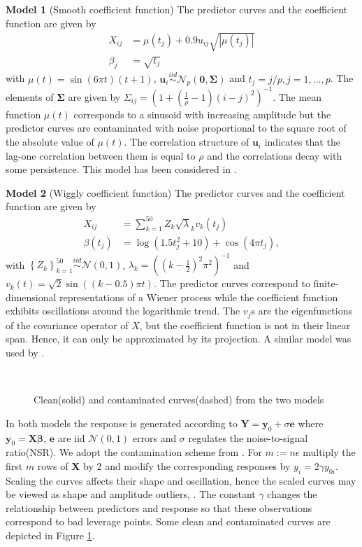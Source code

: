 \documentclass[11pt]{article}
\begin{document}
\textbf{Model 1} (Smooth coefficient function) The predictor curves and the coefficient function are given by
\begin{align*}
X_{ij} &= \mu(t_j) + 0.9 u_{ij}\sqrt{| \mu\left(t_j\right) |} \\ 
\beta_j & = \sqrt{t_{j}} 
\end{align*}
with $\mu(t) = \sin\left(6\pi t\right) \left(t+1\right)$, $\mathbf{u}_i \stackrel{iid}{\sim} \mathcal{N}_p \left( \mathbf{0}, \boldsymbol{\Sigma} \right)$ and $t_j = j/p, j = 1, \ldots, p$. The elements of $\boldsymbol{\Sigma}$ are given by $\Sigma_{ij} =\left( 1+\left( \frac{1}{\rho}-1 \right)(i-j)^2\right)^{-1}$. The mean function $\mu(t)$ corresponds to a sinusoid with increasing amplitude but the predictor curves are contaminated with noise proportional to the square root of the absolute value of $\mu(t)$.  The correlation structure of $\mathbf{u}_i$ indicates that the lag-one correlation between them is equal to $\rho$ and the correlations decay with some persistence. This model has been considered in \citet{maronna2013robust}.

\textbf{Model 2} (Wiggly coefficient function) The predictor curves and the coefficient function are given by
\begin{align*}
X_{ij} &=  \sum_{k=1}^{50} Z_k\sqrt{\lambda}_k v_k(t_j) \\ 
\beta\left(t_j\right) & = \log(1.5t_j^2 + 10) + \cos\left(4 \pi t_j\right),
\end{align*}
with $\left\{Z_k\right\}_{k=1}^{50} \stackrel{iid}{\sim} \mathcal{N}(0,1)$, $\lambda_k = \left((k-\frac{1}{2})^2 \pi^2 \right)^{-1}$ and $v_k(t) = \sqrt{2} \sin((k-0.5)\pi t)$. The predictor curves correspond to finite-dimensional representations of a Wiener process while the coefficient function exhibits oscillations around the logarithmic trend.  The $v_j$s are the eigenfunctions of the covariance operator of $X$, but the coefficient function is not in their linear span. Hence, it can only be approximated by its projection. A similar model was used by \cite{cardot2003spline}.  
\begin{figure}[ht!]
\centering
{} \
\caption{Clean(solid) and contaminated curves(dashed) from the two models}
\label{fig:2}
\end{figure}

In both models the response is generated according to $\mathbf{Y} = \mathbf{y}_0 + \sigma \mathbf{e}$ where $\mathbf{y}_0 = \mathbf{X} \boldsymbol{\beta}$, $\mathbf{e}$ are iid $\mathcal{N}(0,1)$ errors and $\sigma$ regulates the noise-to-signal ratio(NSR). We adopt the contamination scheme from \cite{maronna2013robust}. For $m := n \epsilon$ multiply the first $m$ rows of $\mathbf{X}$ by 2 and modify the corresponding responses by  $y_i = 2\gamma y_{0i}$. Scaling the curves affects their shape and oscillation, hence the scaled curves may be viewed as shape and amplitude outliers, \citep{hubert2015multivariate}. The constant $\gamma$ changes the relationship between predictors and response so that these observations correspond to bad leverage points.  Some clean and contaminated curves are depicted in Figure \ref{fig:2}. 
\end{document}
